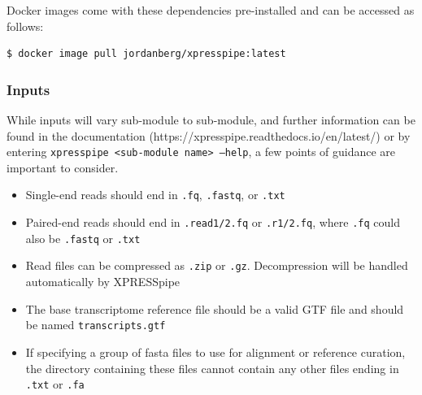 \documentclass[11pt, a4paper, oneside]{article}
\begin{document}
Docker images come with these dependencies pre-installed and can be accessed as follows:

\begin{lstlisting}[language=bash, caption=Docker installation]
$ docker image pull jordanberg/xpresspipe:latest
\end{lstlisting}

\subsubsection{Inputs}
While inputs will vary sub-module to sub-module, and further information can be found in the documentation (https://xpresspipe.readthedocs.io/en/latest/) or by entering \texttt{xpresspipe \textless sub-module name\textgreater \ --help}, a few points of guidance are important to consider.

\begin{itemize}
\item Single-end reads should end in \texttt{.fq}, \texttt{.fastq}, or \texttt{.txt}
\item Paired-end reads should end in \texttt{.read1/2.fq} or \texttt{.r1/2.fq}, where \texttt{.fq} could also be \texttt{.fastq} or \texttt{.txt}
\item Read files can be compressed as \texttt{.zip} or \texttt{.gz}. Decompression will be handled automatically by XPRESSpipe
\item The base transcriptome reference file should be a valid GTF file and should be named \texttt{transcripts.gtf}
\item If specifying a group of fasta files to use for alignment or reference curation, the directory containing these files cannot contain any other files ending in \texttt{.txt} or \texttt{.fa}
\end{itemize}
\end{document}
